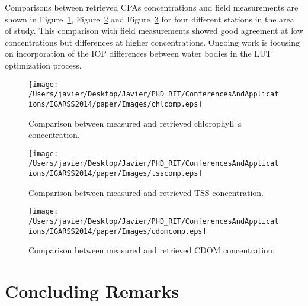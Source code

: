 Comparisons between retrieved CPAs concentrations and field measurements are shown in Figure~\ref{fig:chlcomp}, Figure~\ref{fig:tsscomp} and Figure~\ref{fig:cdomcomp} for four different stations in the area of study. This comparison with field measurements showed good agreement at low concentrations but differences at higher concentrations. Ongoing work is focusing on incorporation of the IOP differences between water bodies in the LUT optimization process.
\begin{figure}[htb]
\centering
    \texttt{[image: /Users/javier/Desktop/Javier/PHD\_RIT/ConferencesAndApplications/IGARSS2014/paper/Images/chlcomp.eps]} 
    \caption{Comparison between measured and retrieved chlorophyll {\it a} concentration.}
    \label{fig:chlcomp} 
\end{figure}     

\begin{figure}[htb]
\centering
    \texttt{[image: /Users/javier/Desktop/Javier/PHD\_RIT/ConferencesAndApplications/IGARSS2014/paper/Images/tsscomp.eps]}   
    \caption{Comparison between measured and retrieved TSS concentration.}
    \label{fig:tsscomp} 
\end{figure}  

\begin{figure}[htb]
\centering
    \texttt{[image: /Users/javier/Desktop/Javier/PHD\_RIT/ConferencesAndApplications/IGARSS2014/paper/Images/cdomcomp.eps]}    
    \caption{Comparison between measured and retrieved CDOM concentration.}
    \label{fig:cdomcomp} 
\end{figure}  

\section{Concluding Remarks}